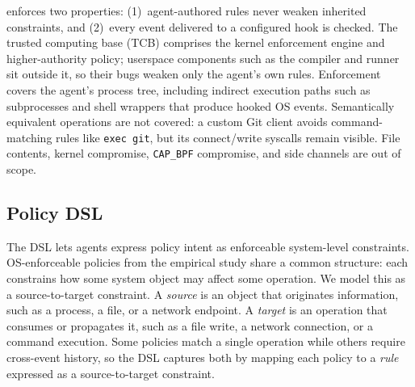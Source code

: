 \sys{} enforces two properties: (1)~agent-authored rules never weaken inherited constraints, and (2)~every event delivered to a configured hook is checked.
The trusted computing base (TCB) comprises the kernel enforcement engine and higher-authority policy; userspace components such as the compiler and runner sit outside it, so their bugs weaken only the agent's own rules.
Enforcement covers the agent's process tree, including indirect execution paths such as subprocesses and shell wrappers that produce hooked OS events.
Semantically equivalent operations are not covered: a custom Git client avoids command-matching rules like \texttt{exec git}, but its connect/write syscalls remain visible.
File contents, kernel compromise, \texttt{CAP\_BPF} compromise, and side channels are out of scope.

\subsection{Policy DSL}
\label{sec:dsl}

The DSL lets agents express policy intent as enforceable system-level constraints.
OS-enforceable policies from the empirical study share a common structure: each constrains how some system object may affect some operation.
We model this as a source-to-target constraint.
A \emph{source} is an object that originates information, such as a process, a file, or a network endpoint.
A \emph{target} is an operation that consumes or propagates it, such as a file write, a network connection, or a command execution.
Some policies match a single operation while others require cross-event history, so the DSL captures both by mapping each policy to a \emph{rule} expressed as a source-to-target constraint.

